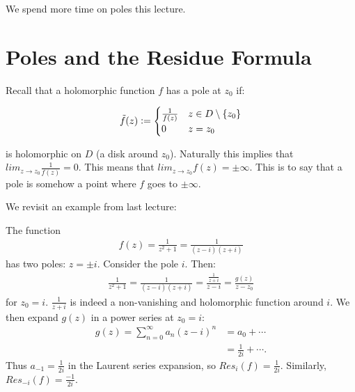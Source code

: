\setcounter{section}{0}
\setcounter{theorem}{0}



We spend more time on poles this lecture.

\section{Poles and the Residue Formula}

\begin{note}
Recall that a holomorphic function $f$ has a pole at $z_0$ if:

\begin{align*}
    \Tilde{f}(z) \vcentcolon = \begin{cases} \frac{1}{f(z)} & z \in D \setminus \{ z_0 \} \\ 0 & z = z_0  \end{cases}
\end{align*}

is holomorphic on $D$ (a disk around $z_0$). Naturally this implies that $lim_{z \to z_0} \frac{1}{f(z)} = 0$. This means that $lim_{z \to z_0} f(z) = \pm \infty$. This is to say that a pole is somehow a point where $f$ goes to $\pm \infty$.

\end{note}



We revisit an example from last lecture:





\begin{example}\label{ex:res-example}
The function
\begin{align*}
f(z) = \frac{1}{z^2+1} = \frac{1}{(z-i)(z+i)}
\end{align*}
has two poles: $z = \pm i$. Consider the pole $i$. Then:
\begin{align*}
    \frac{1}{z^2+1} = \frac{1}{(z-i)(z+i)} = \frac{\frac{1}{z+i}}{z-i} = \frac{g(z)}{z-z_0}
\end{align*}
for $z_0 = i$. $\frac{1}{z+i}$ is indeed a non-vanishing and holomorphic function around $i$. We then expand $g(z)$ in a power series at $z_0 = i$:
\begin{align*}
    g(z) = \sum _{n=0}^\infty a_n (z-i)^n &= a_0 + \cdots\\ &= \frac{1}{2i} + \cdots.
\end{align*}
Thus $a_{-1} = \frac{1}{2i}$ in the Laurent series expansion, so $Res_i(f) = \frac{1}{2i}$. Similarly, $Res_{-i}(f) = \frac{-1}{2i}$.
\end{example}

